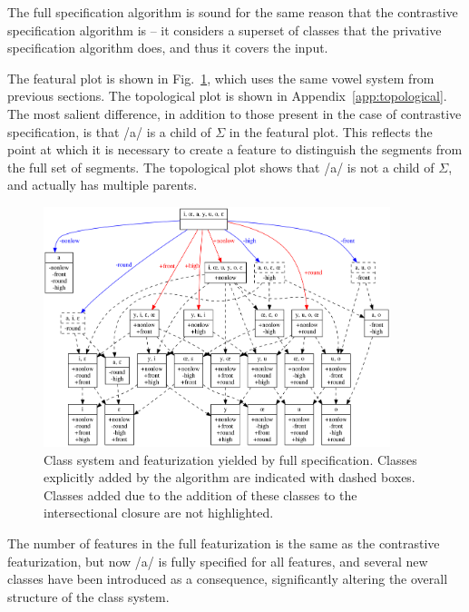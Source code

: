 \documentclass[11pt, oneside]{article}   	%
\begin{document}
\vspace{\baselineskip} \noindent The full specification algorithm is sound for the same reason that the contrastive specification algorithm is -- it considers a superset of classes that the privative specification algorithm does, and thus it covers the input.

The featural plot is shown in Fig.~\ref{fig:vowel_inventory_full}, which uses the same vowel system from previous sections. The topological plot is shown in Appendix~\ref{app:topological}. The most salient difference, in addition to those present in the case of contrastive specification, is that /a/ is a child of $\Sigma$ in the featural plot. This reflects the point at which it is necessary to create a  feature to distinguish the  segments from the full set of segments. The topological plot shows that /a/ is not a child of $\Sigma$, and actually has multiple parents.

\begin{figure}[htb!]
	\centering
	\includegraphics[width=0.9\textwidth]{vowel_inventory_full_FEATURAL.png}
	\caption{Class system and featurization yielded by full specification.  Classes explicitly added by the algorithm are indicated with dashed boxes. Classes added due to the addition of these classes to the intersectional closure are not highlighted.}
	\label{fig:vowel_inventory_full}
\end{figure}

The number of features in the full featurization is the same as the contrastive featurization, but now /a/ is fully specified for all features, and several new classes have been introduced as a consequence, significantly altering the overall structure of the class system.
\end{document}
